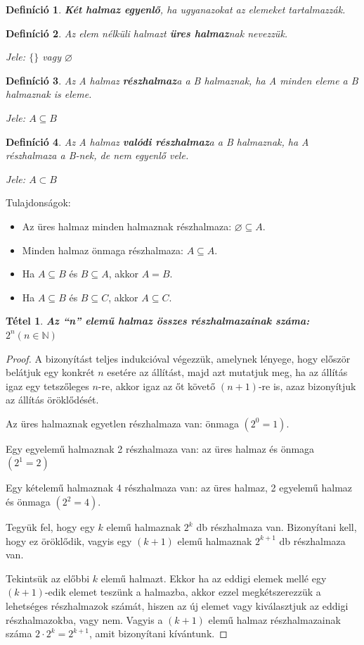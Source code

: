 \documentclass[12pt,a4paper]{article}
\newtheorem{theorem}{Tétel} [section]
\newtheorem{definition}{Definíció} [section]
\begin{document}
\begin{definition}
\textbf{Két halmaz egyenlő}, ha ugyanazokat az elemeket tartalmazzák.
\end{definition}

\begin{definition}
Az elem nélküli halmazt \textbf{üres halmaz}nak nevezzük.

Jele: $\{ \}$ vagy $\varnothing$ 
\end{definition}

\begin{definition}
Az A halmaz \textbf{részhalmaz}a a B halmaznak, ha A minden eleme a B halmaznak is eleme.

Jele: $A\subseteq B$
\end{definition}

\begin{definition}
Az A halmaz \textbf{valódi részhalmaz}a a B halmaznak, ha A részhalmaza a B-nek, de nem egyenlő vele.

Jele: $A\subset B$
\end{definition}

Tulajdonságok:
\begin{itemize}
\item Az üres halmaz minden halmaznak részhalmaza: $\varnothing \subseteq A$.
\item Minden halmaz önmaga részhalmaza: $A\subseteq A$.
\item Ha $A\subseteq B$ és $B\subseteq A$, akkor $A=B$.
\item Ha $A\subseteq B$ és $B\subseteq C$, akkor $A\subseteq C$. 
\end{itemize}
\newpage
\begin{theorem}
\textbf{Az ``n'' elemű halmaz összes részhalmazainak száma: $2^n (n\in \mathbb{N})$}
\end{theorem}
\begin{proof}
A bizonyítást teljes indukcióval végezzük, amelynek lényege, hogy először belátjuk egy konkrét $n$ esetére az állítást, majd azt mutatjuk meg, ha az állítás igaz egy tetszőleges $n$-re, akkor igaz az őt követő $(n + 1)$-re is, azaz bizonyítjuk az állítás öröklődését.

Az üres halmaznak egyetlen részhalmaza van: önmaga $(2^0 = 1)$.

Egy egyelemű halmaznak 2 részhalmaza van: az üres halmaz és önmaga $(2^1 = 2)$

Egy kételemű halmaznak 4 részhalmaza van: az üres halmaz, 2 egyelemű halmaz és önmaga $(2^2 = 4)$.

Tegyük fel, hogy egy $k$ elemű halmaznak $2^k$ db részhalmaza van. Bizonyítani kell, hogy ez öröklődik, vagyis egy $(k + 1)$ elemű halmaznak $2^{k + 1}$ db részhalmaza van.

Tekintsük az előbbi $k$ elemű halmazt. Ekkor ha az eddigi elemek mellé egy $(k + 1)$-edik elemet teszünk a halmazba, akkor ezzel megkétszerezzük a lehetséges részhalmazok számát, hiszen az új elemet vagy kiválasztjuk az eddigi részhalmazokba, vagy nem. Vagyis a $(k + 1)$ elemű halmaz részhalmazainak száma $2 \cdot 2^k = 2^{k + 1}$, amit bizonyítani kívántunk.
\end{proof}
\end{document}
